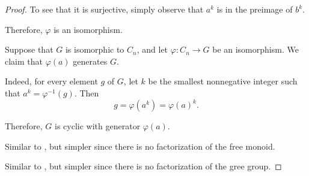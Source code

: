\begin{proof}
  To see that it is surjective, simply observe that \( a^k \) is in the preimage of \( b^k \).

  Therefore, \( \varphi \) is an isomorphism.

  \NecessitySubProof* Suppose that \( G \) is isomorphic to \( C_n \), and let \( \varphi: C_n \to G \) be an isomorphism. We claim that \( \varphi(a) \) generates \( G \).

  Indeed, for every element \( g \) of \( G \), let \( k \) be the smallest nonnegative integer such that \( a^k = \varphi^{-1}(g) \). Then
  \begin{equation*}
    g = \varphi(a^k) = \varphi(a)^k.
  \end{equation*}

  Therefore, \( G \) is cyclic with generator \( \varphi(a) \).

   Similar to , but simpler since there is no factorization of the free monoid.

   Similar to , but simpler since there is no factorization of the gree group.
\end{proof}

